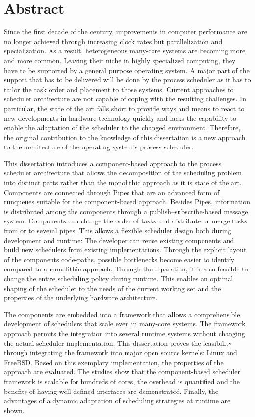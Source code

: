 \chapter*{Abstract}

Since the first decade of the  century, improvements in computer performance are no longer achieved through increasing clock rates but parallelization and specialization. As a result, heterogeneous many-core systems are becoming more and more common. Leaving their niche in highly specialized computing, they have to be supported by a general purpose operating system. A major part of the support that has to be delivered will be done by the process scheduler as it has to tailor the task order and placement to those systems. Current approaches to scheduler architecture are not capable of coping with the resulting challenges. In particular, the state of the art falls short to provide ways and means to react to new developments in hardware technology quickly and lacks the capability to enable the adaptation of the scheduler to the changed environment. Therefore, the original contribution to the knowledge of this dissertation is a new approach to the architecture of the operating system's process scheduler.

This dissertation introduces a component-based approach to the process scheduler architecture that allows the decomposition of the scheduling problem into distinct parts rather than the monolithic approach as it is state of the art. Components are connected through Pipes that are an advanced form of runqueues suitable for the component-based approach. Besides Pipes, information is distributed among the components through a publish–subscribe-based message system. Components can change the order of tasks and distribute or merge tasks from or to several pipes. This allows a flexible scheduler design both during development and runtime: The developer can reuse existing components and build new schedulers from existing implementations. Through the explicit layout of the components code-paths, possible bottlenecks become easier to identify compared to a monolithic approach. Through the separation, it is also feasible to change the entire scheduling policy during runtime. This enables an optimal shaping of the scheduler to the needs of the current working set and the properties of the underlying hardware architecture.

The components are embedded into a framework that allows a comprehensible development of schedulers that scale even in many-core systems. The framework approach permits the integration into several runtime systems without changing the actual scheduler implementation. This dissertation proves the feasibility through integrating the framework into major open source kernels: Linux and FreeBSD. Based on this exemplary implementation, the properties of the approach are evaluated. The studies show that the component-based scheduler framework is scalable for hundreds of cores, the overhead is quantified and the benefits of having well-defined interfaces are demonstrated. Finally, the advantages of a dynamic adaptation of scheduling strategies at runtime are shown.